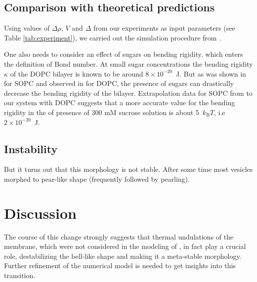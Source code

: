 \documentclass[10pt,a4paper,draft]{article}
\begin{document}


\subsection{Comparison with theoretical predictions}
Using values of $\Delta\rho$, $V$ and $\Delta$ from our experiments as input parameters (see Table \ref{tab:experiment}), we carried out the simulation procedure from \cite{Boedec2012}.

One also needs to consider an effect of sugars on bending rigidity, which enters the definition of Bond number.
At small sugar concentrations the bending rigidity $\kappa$ of the DOPC bilayer is known to be around $8\times10^{-20}$~J.
But as was shown in \cite{Vitkova2006} for SOPC and observed in \cite{Shchelokovskyy2011} for DOPC, the presence of sugars can drastically decrease the bending rigidity of the bilayer. 
Extrapolation data for SOPC from \cite{Vitkova2006} to our system with DOPC suggests that a more accurate value for the bending rigidity in the of presence of 300 mM sucrose solution is about 5~$k_\mathrm{B}T$, i.e $2\times10^{-20}$~J.

\subsection{Instability}
But it turns out that this morphology is not stable. After some time most vesicles morphed to pear-like shape (frequently followed by pearling).

\section{Discussion}\label{discussion}
The course of this change strongly suggests that thermal undulations of the membrane, which were not considered in the modeling of \cite{Boedec2012}, in fact play a crucial role, destabilizing the bell-like shape and making it a meta-stable morphology. Further refinement of the numerical model is needed to get insights into this transition.


\end{document}
